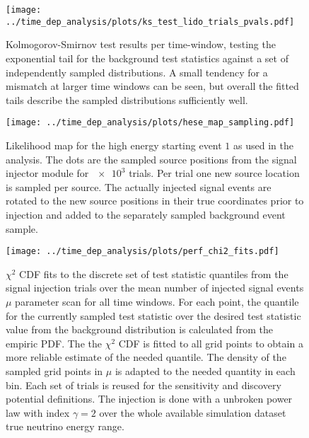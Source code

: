 \begin{figure}[H]
  \centering
  \texttt{[image: ../time\_dep\_analysis/plots/ks\_test\_lido\_trials\_pvals.pdf]}
  \caption[KS test results for the independent BG trials]{
    Kolmogorov-Smirnov test results per time-window, testing the exponential tail for the background test statistics against a set of independently sampled distributions.
    A small tendency for a mismatch at larger time windows can be seen, but overall the fitted tails describe the sampled distributions sufficiently well.
  }
  \label{fig:ks_test_lido_trials_pvals}
\end{figure}
\enlargethispage*{5cm}
\begin{figure}[H]
  \centering
  \texttt{[image: ../time\_dep\_analysis/plots/hese\_map\_sampling.pdf]}
  \caption[Sampling from a healpy map for the signal source injection]{
    Likelihood map for the high energy starting event $1$ as used in the analysis.
    The dots are the sampled source positions from the signal injector module for $\num{e3}$ trials.
    Per trial one new source location is sampled per source.
    The actually injected signal events are rotated to the new source positions in their true coordinates prior to injection and added to the separately sampled background event sample.
  }
  \label{fig:hese_map_sampling}
\end{figure}

\begin{figure}[H]
  \centering
  \texttt{[image: ../time\_dep\_analysis/plots/perf\_chi2\_fits.pdf]}
  \caption[$\chi^2$ CDF fits per time window for the analysis performance]{
     $\chi^2$ CDF fits to the discrete set of test statistic quantiles from the signal injection trials over the mean number of injected signal events $\mu$ parameter scan for all time windows.
     For each point, the quantile for the currently sampled test statistic over the desired test statistic value from the background distribution is calculated from the empiric PDF.
     The the $\chi^2$ CDF is fitted to all grid points to obtain a more reliable estimate of the needed quantile.
     The density of the sampled grid points in $\mu$ is adapted to the needed quantity in each bin.
     Each set of trials is reused for the sensitivity and discovery potential definitions.
     The injection is done with a unbroken power law with index $\gamma=2$ over the whole available simulation dataset true neutrino energy range.
  }
  \label{fig:tdep_perf_chi2_fits}
\end{figure}


